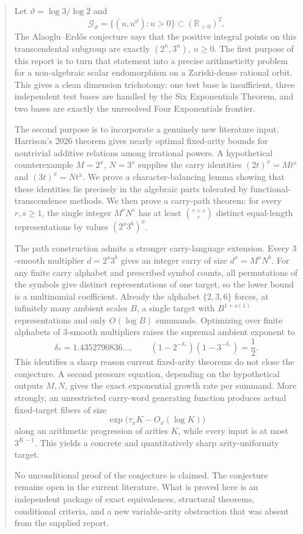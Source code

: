 \documentclass[11pt,oneside]{article}
\theoremstyle{definition}
\newcommand{\R}{\mathbb{R}}
\newcommand{\cG}{\mathscr{G}}
\begin{document}
\begin{abstract}
Let $\vartheta=\log 3/\log 2$ and
\[
   \cG_{\vartheta}=\{(u,u^{\vartheta}):u>0\}\subset(\R_{>0})^2.
\]
The Alaoglu--Erd\H{o}s conjecture says that the positive integral points on this transcendental subgroup are exactly $(2^n,3^n)$, $n\geq0$.  The first purpose of this report is to turn that statement into a precise arithmeticity problem for a non-algebraic scalar endomorphism on a Zariski-dense rational orbit.  This gives a clean dimension trichotomy: one test base is insufficient, three independent test bases are handled by the Six Exponentials Theorem, and two bases are exactly the unresolved Four Exponentials frontier.

The second purpose is to incorporate a genuinely new literature input.  Harrison's 2026 theorem gives nearly optimal fixed-arity bounds for nontrivial additive relations among irrational powers.  A hypothetical counterexample $M=2^x$, $N=3^x$ supplies the carry identities $(2t)^x=M t^x$ and $(3t)^x=N t^x$.  We prove a character-balancing lemma showing that these identities lie precisely in the algebraic parts tolerated by functional-transcendence methods.  We then prove a carry-path theorem: for every $r,s\geq1$, the single integer $M^rN^s$ has at least $\binom{r+s}{r}$ distinct equal-length representations by values $(2^a3^b)^x$.

The path construction admits a stronger carry-language extension.  Every $3$-smooth multiplier $d=2^a3^b$ gives an integer carry of size $d^x=M^aN^b$.  For any finite carry alphabet and prescribed symbol counts, all permutations of the symbols give distinct representations of one target, so the lower bound is a multinomial coefficient.  Already the alphabet $\{2,3,6\}$ forces, at infinitely many ambient scales $B$, a single target with $B^{1+o(1)}$ representations and only $O(\log B)$ summands.  Optimizing over finite alphabets of $3$-smooth multipliers raises the supremal ambient exponent to
\[
 \delta_* = 1.4352790836\ldots,
 \qquad
 (1-2^{-\delta_*})(1-3^{-\delta_*})=\frac12.
\]
This identifies a sharp reason current fixed-arity theorems do not close the conjecture.  A second pressure equation, depending on the hypothetical outputs $M,N$, gives the exact exponential growth rate per summand.  More strongly, an unrestricted carry-word generating function produces actual fixed-target fibers of size
\[
       \exp\bigl(\tau_x K-O_x(\log K)\bigr)
\]
along an arithmetic progression of arities $K$, while every input is at most $3^{K-1}$.  This yields a concrete and quantitatively sharp arity-uniformity target.

No unconditional proof of the conjecture is claimed.  The conjecture remains open in the current literature.  What is proved here is an independent package of exact equivalences, structural theorems, conditional criteria, and a new variable-arity obstruction that was absent from the supplied report.
\end{abstract}
\end{document}
